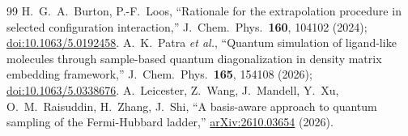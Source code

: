 \begin{thebibliography}{99}
 H.~G.~A.~Burton, P.-F.~Loos, ``Rationale for the extrapolation procedure in selected configuration interaction,'' J.\ Chem.\ Phys.\ \textbf{160}, 104102 (2024); \href{https://doi.org/10.1063/5.0192458}{doi:10.1063/5.0192458}.
 A.~K.~Patra \emph{et al.}, ``Quantum simulation of ligand-like molecules through sample-based quantum diagonalization in density matrix embedding framework,'' J.\ Chem.\ Phys.\ \textbf{165}, 154108 (2026); \href{https://doi.org/10.1063/5.0338676}{doi:10.1063/5.0338676}.
 A.~Leicester, Z.~Wang, J.~Mandell, Y.~Xu, O.~M.~Raisuddin, H.~Zhang, J.~Shi, ``A basis-aware approach to quantum sampling of the Fermi-Hubbard ladder,'' \href{https://arxiv.org/abs/2610.03654}{arXiv:2610.03654} (2026).
\end{thebibliography}
